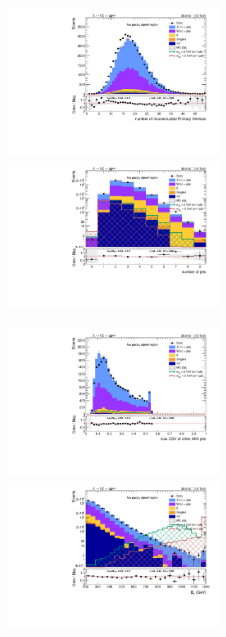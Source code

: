 \begin{figure}[!htb]
  \begin{center}  
    \includegraphics[width=0.495\textwidth]{plots/v9_thesis/XVZnnlpSR/nPV.pdf}
    \includegraphics[width=0.495\textwidth]{plots/v9_thesis/XVZnnlpSR/nJets.pdf}

    \includegraphics[width=0.495\textwidth]{plots/v9_thesis/XVZnnlpSR/MaxJetBTag.pdf}
    \includegraphics[width=0.495\textwidth]{plots/v9_thesis/XVZnnlpSR/MEt_pt.pdf}


\end{center}
\end{figure}
